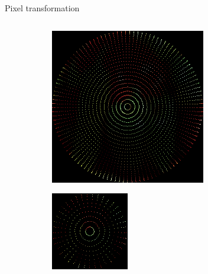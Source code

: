 \documentclass{beamer}
\begin{document}
\begin{frame}{Pixel transformation}
\begin{columns}
\begin{column}{0.5\textwidth}
\begin{figure}
\begin{subfigure}{.48\textwidth}
            \end{subfigure}
            \begin{subfigure}{.48\textwidth}
                \centering
            \includegraphics[width=\textwidth]{figures/pepper_bilinear.png}
            \end{subfigure}
            \begin{subfigure}{.48\textwidth}
                \centering
            \includegraphics[width=\textwidth]{figures/pepper_integral.png}

\end{subfigure}
\end{figure}
\end{column}
\end{columns}
\end{frame}
\end{document}
